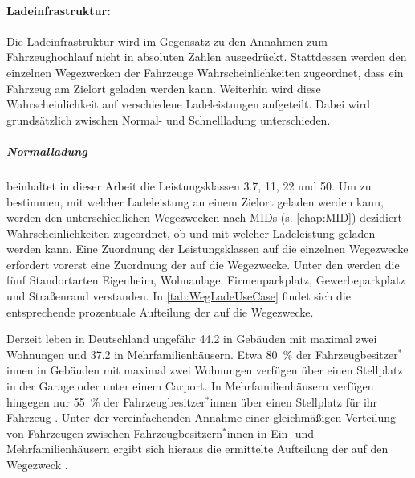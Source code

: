 


\paragraph{Ladeinfrastruktur:}

Die Ladeinfrastruktur wird im Gegensatz zu den Annahmen zum Fahrzeughochlauf nicht in absoluten Zahlen ausgedrückt.
Stattdessen werden den einzelnen Wegezwecken der Fahrzeuge Wahrscheinlichkeiten zugeordnet, dass ein Fahrzeug am Zielort geladen werden kann.
Weiterhin wird diese Wahrscheinlichkeit auf verschiedene Ladeleistungen aufgeteilt.
Dabei wird grundsätzlich zwischen Normal- und Schnellladung unterschieden.


\subparagraph{Normalladung} beinhaltet in dieser Arbeit die Leistungsklassen \SI{3.7}{\kw}, \SI{11}{\kw}, \SI{22}{\kw} und \SI{50}{\kw}.
Um zu bestimmen, mit welcher Ladeleistung an einem Zielort geladen werden kann, werden den unterschiedlichen Wegezwecken nach \glspl{MID} (s. \autoref{chap:MID}) dezidiert Wahrscheinlichkeiten zugeordnet, ob und mit welcher Ladeleistung geladen werden kann.
Eine Zuordnung der Leistungsklassen auf die einzelnen Wegezwecke erfordert vorerst eine Zuordnung der \UCs auf die Wegezwecke.
Unter den \UCs werden die fünf Standortarten Eigenheim, Wohnanlage, Firmenparkplatz, Gewerbeparkplatz und Straßenrand verstanden.
In \autoref{tab:WegLadeUseCase} findet sich die entsprechende prozentuale Aufteilung der \UCs auf die Wegezwecke.



Derzeit leben in Deutschland ungefähr \SI{44.2}{\MioMen} in Gebäuden mit maximal zwei Wohnungen und \SI{37.2}{\MioMen} in Mehrfamilienhäusern.
Etwa \SI{80}{\percent} der \linebreak Fahrzeugbesitzer$^*$innen in Gebäuden mit maximal zwei Wohnungen verfügen über einen Stellplatz in der Garage oder unter einem Carport.
In Mehrfamilienhäusern verfügen hingegen nur \SI{55}{\percent} der Fahrzeugbesitzer$^*$innen über einen Stellplatz für ihr Fahrzeug \cite{dena2020}.
Unter der vereinfachenden Annahme einer gleichmäßigen Verteilung von Fahrzeugen zwischen Fahrzeugbesitzern$^*$innen in Ein- und Mehrfamilienhäusern ergibt sich hieraus die ermittelte Aufteilung der \UCs auf den Wegezweck \nHdot.\medskip

